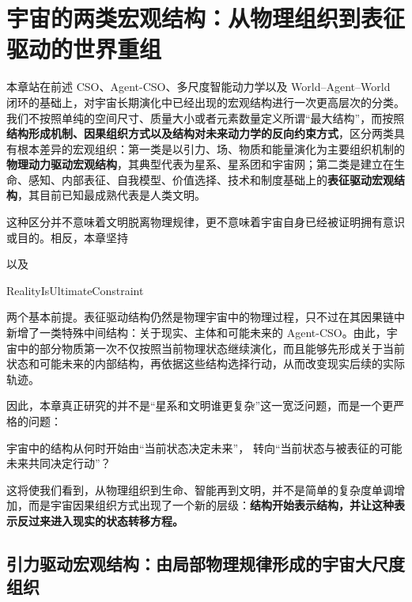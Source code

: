 \chapter{宇宙的两类宏观结构：从物理组织到表征驱动的世界重组}
\label{chap:universe_two_macrostructures}

\begin{chapterlead}
本章站在前述 CSO、Agent-CSO、多尺度智能动力学以及 World--Agent--World 闭环的基础上，对宇宙长期演化中已经出现的宏观结构进行一次更高层次的分类。我们不按照单纯的空间尺寸、质量大小或者元素数量定义所谓“最大结构”，而按照\textbf{结构形成机制、因果组织方式以及结构对未来动力学的反向约束方式}，区分两类具有根本差异的宏观组织：第一类是以引力、场、物质和能量演化为主要组织机制的\textbf{物理动力驱动宏观结构}，其典型代表为星系、星系团和宇宙网；第二类是建立在生命、感知、内部表征、自我模型、价值选择、技术和制度基础上的\textbf{表征驱动宏观结构}，其目前已知最成熟代表是人类文明。

这种区分并不意味着文明脱离物理规律，更不意味着宇宙自身已经被证明拥有意识或目的。相反，本章坚持
\begin{statementbox}
\centering
{}
\end{statementbox}
以及
\begin{statementbox}
RealityIsUltimateConstraint
\end{statementbox}
两个基本前提。表征驱动结构仍然是物理宇宙中的物理过程，只不过在其因果链中新增了一类特殊中间结构：关于现实、主体和可能未来的 Agent-CSO。由此，宇宙中的部分物质第一次不仅按照当前物理状态继续演化，而且能够先形成关于当前状态和可能未来的内部结构，再依据这些结构选择行动，从而改变现实后续的实际轨迹。

因此，本章真正研究的并不是“星系和文明谁更复杂”这一宽泛问题，而是一个更严格的问题：
\begin{statementbox}
宇宙中的结构从何时开始由``当前状态决定未来''，
转向``当前状态与被表征的可能未来共同决定行动''？
\end{statementbox}
这将使我们看到，从物理组织到生命、智能再到文明，并不是简单的复杂度单调增加，而是宇宙因果组织方式出现了一个新的层级：\textbf{结构开始表示结构，并让这种表示反过来进入现实的状态转移方程。}
\end{chapterlead}

\section{引力驱动宏观结构：由局部物理规律形成的宇宙大尺度组织}

